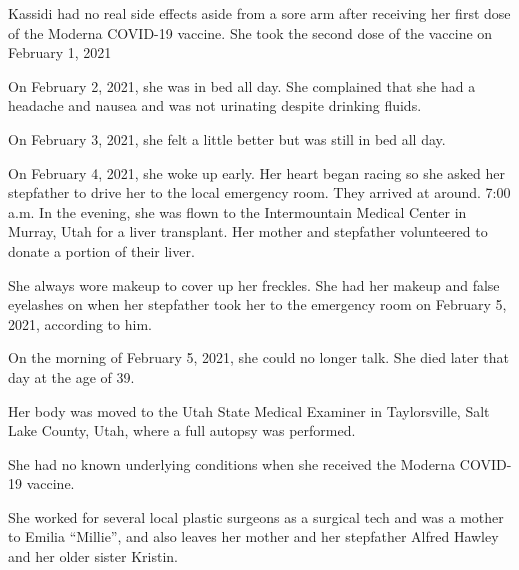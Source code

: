 Kassidi had no real side effects aside from a sore arm after receiving her first
dose of the Moderna COVID-19 vaccine. She took the second dose of the vaccine on
February 1, 2021

On February 2, 2021, she was in bed all day. She complained that she had a
headache and nausea and was not urinating despite drinking fluids.

On February 3, 2021, she felt a little better but was still in bed all day.

On February 4, 2021, she woke up early. Her heart began racing so she asked her
stepfather to drive her to the local emergency room. They arrived at
around. 7:00 a.m. In the evening, she was flown to the Intermountain Medical
Center in Murray, Utah for a liver transplant. Her mother and stepfather
volunteered to donate a portion of their liver.

She always wore makeup to cover up her freckles. She had her makeup and false
eyelashes on when her stepfather took her to the emergency room on February 5,
2021, according to him.

On the morning of February 5, 2021, she could no longer talk. She died later
that day at the age of 39.

Her body was moved to the Utah State Medical Examiner in Taylorsville, Salt Lake
County, Utah, where a full autopsy was performed.

She had no known underlying conditions when she received the Moderna COVID-19
vaccine.

She worked for several local plastic surgeons as a surgical tech and was a
mother to Emilia “Millie”, and also leaves her mother and her stepfather Alfred
Hawley and her older sister Kristin.

